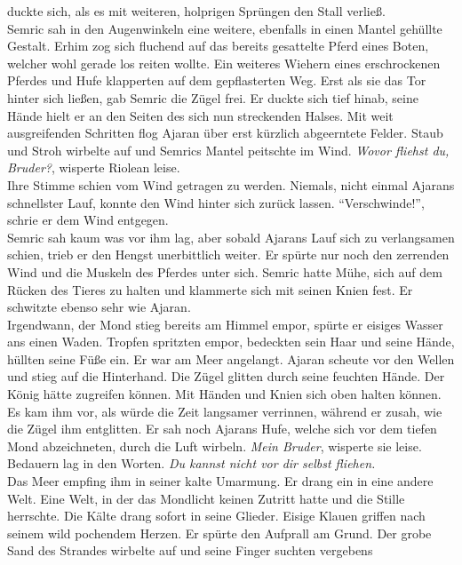 duckte sich, als es mit 
weiteren, holprigen Sprüngen den Stall verließ.\\
Semric sah in den Augenwinkeln eine weitere, ebenfalls in einen Mantel gehüllte 
Gestalt. Erhim zog 
sich fluchend auf das bereits gesattelte Pferd eines Boten, welcher wohl gerade 
los reiten wollte. 
Ein weiteres Wiehern eines erschrockenen Pferdes und Hufe klapperten auf dem 
gepflasterten Weg. 
Erst als sie das Tor hinter sich ließen, gab Semric die Zügel frei. Er duckte 
sich tief hinab, 
seine Hände hielt er an den Seiten des sich nun streckenden Halses. Mit weit 
ausgreifenden 
Schritten flog Ajaran über erst kürzlich abgeerntete Felder. Staub und Stroh 
wirbelte auf und 
Semrics Mantel peitschte im Wind. \textit{Wovor fliehst du, Bruder?}, wisperte 
Riolean leise.\\
Ihre Stimme schien vom Wind getragen zu werden. Niemals, nicht einmal Ajarans 
schnellster Lauf, 
konnte den Wind hinter sich zurück lassen. ``Verschwinde!'', schrie er dem Wind 
entgegen. \\
Semric sah kaum was vor ihm lag, aber sobald Ajarans Lauf sich zu verlangsamen 
schien, trieb er den 
Hengst unerbittlich weiter. Er spürte nur noch den zerrenden Wind und die 
Muskeln des Pferdes unter 
sich. Semric hatte Mühe, sich auf dem Rücken des Tieres zu halten und klammerte 
sich mit seinen 
Knien fest. Er schwitzte ebenso sehr wie Ajaran. \\
Irgendwann, der Mond stieg bereits am Himmel empor, spürte er eisiges Wasser 
ans einen Waden. 
Tropfen spritzten empor, bedeckten sein Haar und seine Hände, hüllten seine 
Füße ein. Er war am 
Meer angelangt. Ajaran scheute vor den Wellen und stieg auf die Hinterhand. Die 
Zügel glitten durch 
seine feuchten Hände. Der König hätte zugreifen können. Mit Händen und Knien 
sich oben halten 
können. Es kam ihm vor, als würde die Zeit langsamer verrinnen, während er 
zusah, wie die Zügel ihm 
entglitten. Er sah noch Ajarans Hufe, welche sich vor dem tiefen Mond 
abzeichneten, durch die Luft 
wirbeln.
\textit{Mein Bruder}, wisperte sie leise. Bedauern lag in den Worten. 
\textit{Du kannst nicht vor 
dir selbst fliehen.}\\
Das Meer empfing ihm in seiner kalte Umarmung. Er drang ein in eine andere 
Welt. Eine Welt, in der 
das Mondlicht keinen Zutritt hatte und die Stille herrschte. Die Kälte drang 
sofort in seine 
Glieder. Eisige Klauen griffen nach seinem wild pochendem Herzen. Er spürte den 
Aufprall am Grund. 
Der grobe Sand des Strandes wirbelte auf und seine Finger suchten vergebens 
